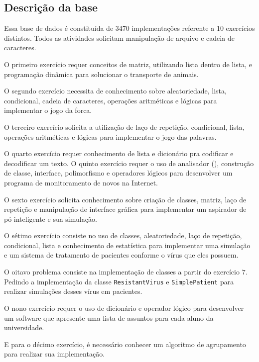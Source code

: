 	\subsection{Descrição da base}
	Essa base de dados é constituída de 3470 implementações referente a 10 exercícios
	distintos. Todos as atividades solicitam manipulação de arquivo e cadeia de caracteres.
	
	O primeiro exercício requer conceitos de matriz, utilizando lista dentro
	de lista, e programação dinâmica para solucionar o transporte de animais.
	
	O segundo exercício necessita de conhecimento sobre aleatoriedade, lista, condicional,
	cadeia de caracteres, operações aritméticas e lógicas para implementar o jogo da
	forca.
	
	O terceiro exercício solicita a utilização de laço de repetição, condicional, lista,
	operações aritméticas e lógicas para implementar o jogo das palavras.
	
	O quarto exercício requer conhecimento de lista e dicionário pra codificar e
	decodificar um texto.
	O quinto exercício requer o uso de analisador (), construção
	de classe, interface, polimorfismo e operadores lógicos para desenvolver um programa
	de monitoramento de novos  na Internet.
	
	O sexto exercício solicita conhecimento sobre criação de classes, matriz, laço de
	repetição e manipulação de interface gráfica para implementar um aspirador de pó
	inteligente e sua simulação.
	
	O sétimo exercício consiste no uso de classes, aleatoriedade, laço de repetição,
	condicional, lista e conhecimento de estatística para implementar uma simulação
	e um sistema de tratamento de pacientes conforme o vírus que eles possuem.
	
	O oitavo problema consiste na implementação de classes a partir do exercício $7$.
	Pedindo a implementação da classe \texttt{ResistantVirus} e \texttt{SimplePatient}
	para realizar simulações desses vírus em pacientes.
	
	O nono exercício requer o uso de dicionário e operador lógico para desenvolver
	um software que apresente uma lista de assuntos para cada aluno da universidade.
	
	E para o décimo exercício, é necessário conhecer um algoritmo de agrupamento para
	realizar sua implementação.
	
